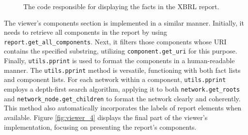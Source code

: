 \begin{figure}[H]
    \centering
    
    \caption{The code responsible for displaying the facts in the XBRL report.}
    \label{fig:viewer_3}
\end{figure}

The viewer's components section is implemented in a similar manner.
Initially, it needs to retrieve all components in the report by using \texttt{report.get\_all\_components}.  
Next, it filters those components whose URI contains the specified substring, utilizing \texttt{component.get\_uri} for this purpose.  
Finally, \texttt{utils.pprint} is used to format the components in a human-readable manner.
The \texttt{utils.pprint} method is versatile, functioning with both fact lists and component lists.  
For each network within a component, \texttt{utils.pprint} employs a depth-first search algorithm,  
applying it to both \texttt{network.get\_roots} and \texttt{network\_node.get\_children} to format the network clearly and coherently.  
This method also automatically incorporates the labels of report elements when available.  
Figure \ref{fig:viewer_4} displays the final part of the viewer's implementation, focusing on presenting the report's components.


